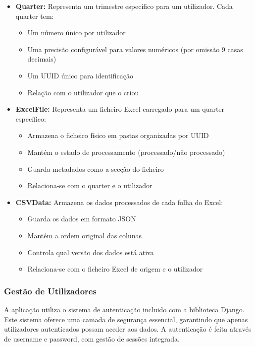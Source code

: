 \begin{itemize}
    \item \textbf{Quarter:} Representa um trimestre específico para um utilizador. Cada quarter tem:
    \begin{itemize}
        \item Um número único por utilizador
        \item Uma precisão configurável para valores numéricos (por omissão 9 casas decimais)
        \item Um UUID único para identificação
        \item Relação com o utilizador que o criou
    \end{itemize}

    \item \textbf{ExcelFile:} Representa um ficheiro Excel carregado para um quarter específico:
    \begin{itemize}
        \item Armazena o ficheiro físico em pastas organizadas por UUID
        \item Mantém o estado de processamento (processado/não processado)
        \item Guarda metadados como a secção do ficheiro
        \item Relaciona-se com o quarter e o utilizador
    \end{itemize}

    \item \textbf{CSVData:} Armazena os dados processados de cada folha do Excel:
    \begin{itemize}
        \item Guarda os dados em formato JSON
        \item Mantém a ordem original das colunas
        \item Controla qual versão dos dados está ativa
        \item Relaciona-se com o ficheiro Excel de origem e o utilizador
    \end{itemize}
\end{itemize}

\subsubsection{Gestão de Utilizadores}

A aplicação utiliza o sistema de autenticação incluido com a biblioteca Django. Este sistema oferece uma camada de segurança essencial, garantindo que apenas utilizadores autenticados possam aceder aos dados. A autenticação é feita através de username e password, com gestão de sessões integrada.

